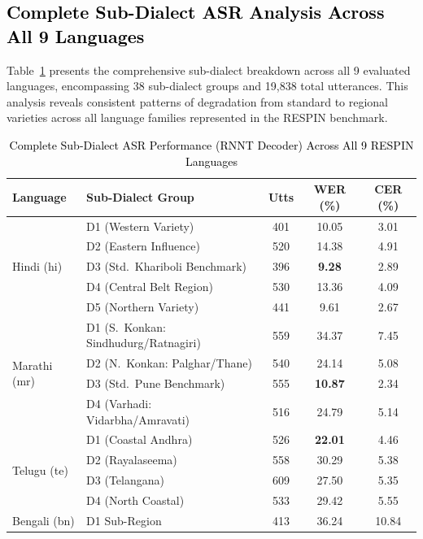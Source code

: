 \subsection{\textcolor{black}{Complete Sub-Dialect ASR Analysis Across All 9 Languages}}

Table~\ref{tab:full_subdialect} presents the comprehensive sub-dialect breakdown across all 9 evaluated languages, encompassing 38 sub-dialect groups and 19,838 total utterances. This analysis reveals consistent patterns of degradation from standard to regional varieties across all language families represented in the RESPIN benchmark.

\begin{table}[t]
\color{black}
\centering
\caption{\textcolor{black}{Complete Sub-Dialect ASR Performance (RNNT Decoder) Across All 9 RESPIN Languages}}
\label{tab:full_subdialect}
\begin{tabular}{llccc}
\hline
\textbf{Language} & \textbf{Sub-Dialect Group} & \textbf{Utts} & \textbf{WER (\%)} & \textbf{CER (\%)} \\
\hline
\multirow{5}{*}{Hindi (hi)}
 & D1 (Western Variety)               & 401 & 10.05 & 3.01 \\
 & D2 (Eastern Influence)             & 520 & 14.38 & 4.91 \\
 & D3 (Std.\ Khariboli Benchmark)     & 396 & \textbf{9.28} & 2.89 \\
 & D4 (Central Belt Region)           & 530 & 13.36 & 4.09 \\
 & D5 (Northern Variety)              & 441 & 9.61 & 2.67 \\
\hline
\multirow{4}{*}{Marathi (mr)}
 & D1 (S.\ Konkan: Sindhudurg/Ratnagiri) & 559 & 34.37 & 7.45 \\
 & D2 (N.\ Konkan: Palghar/Thane)    & 540 & 24.14 & 5.08 \\
 & D3 (Std.\ Pune Benchmark)         & 555 & \textbf{10.87} & 2.34 \\
 & D4 (Varhadi: Vidarbha/Amravati)   & 516 & 24.79 & 5.14 \\
\hline
\multirow{4}{*}{Telugu (te)}
 & D1 (Coastal Andhra)               & 526 & \textbf{22.01} & 4.46 \\
 & D2 (Rayalaseema)                  & 558 & 30.29 & 5.38 \\
 & D3 (Telangana)                    & 609 & 27.50 & 5.35 \\
 & D4 (North Coastal)                & 533 & 29.42 & 5.55 \\
\hline
\multirow{5}{*}{Bengali (bn)}
 & D1 Sub-Region                     & 413 & 36.24 & 10.84 \\

\end{tabular}
\end{table}
